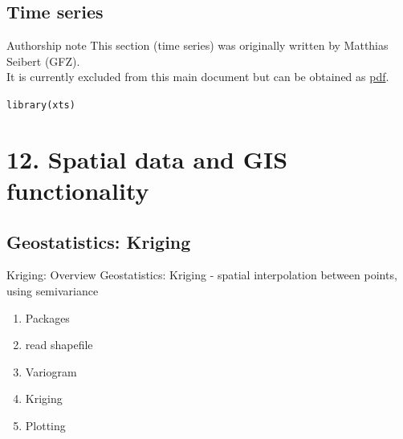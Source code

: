 \documentclass[xcolor=table,       handout,    xcolor=dvipsnames]{beamer}\usepackage[]{graphicx}\usepackage[]{color}
\makeatletter
\newcommand{\hlstd}[1]{\textcolor[rgb]{0,0,0}{#1}}
\newcommand{\hlkwd}[1]{\textcolor[rgb]{0,0,1}{#1}}
\newenvironment{kframe}{%
 \def\at@end@of@kframe{}%
 \ifinner\ifhmode%
  \def\at@end@of@kframe{\end{minipage}}%
  \begin{minipage}{\columnwidth}%
 \fi\fi%
 \def\FrameCommand##1{\hskip\@totalleftmargin \hskip-\fboxsep
 \colorbox{shadecolor}{##1}\hskip-\fboxsep
     \hskip-\linewidth \hskip-\@totalleftmargin \hskip\columnwidth}%
 \MakeFramed {\advance\hsize-\width
   \@totalleftmargin\z@ \linewidth\hsize
   \@setminipage}}%
 {\par\unskip\endMakeFramed%
 \at@end@of@kframe}
\newenvironment{knitrout}{}{} %
\makeatother
\begin{document}
\subsection{Time series}

\begin{frame}{Authorship note}
This section (time series) was originally written by Matthias Seibert (GFZ).\\
It is currently excluded from this main document but can be obtained as \href{https://dl.dropboxusercontent.com/u/4836866/R_course_Berry/RcourseBerry_Mathias.pdf}{pdf}.

\begin{knitrout}
\color{fgcolor}\begin{kframe}
\begin{alltt}
\hlkwd{library}\hlstd{(xts)}
\end{alltt}
\end{kframe}
\end{knitrout}
\end{frame}

\section{12. Spatial data and GIS functionality}

\subsection{Geostatistics: Kriging}

\begin{frame}[fragile]{Kriging: Overview}
Geostatistics: Kriging - spatial interpolation between points, using semivariance
\begin{enumerate}
\item Packages
\item read shapefile
\item Variogram
\item Kriging
\item Plotting
\end{enumerate}
\end{frame}
\end{document}
